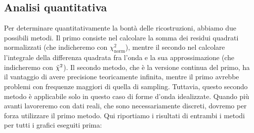 \documentclass{article}[a4paper, oneside,11pt]
\begin{document}
    \subsection{Analisi quantitativa}
    Per determinare quantitativamente la bontà delle ricostruzioni, abbiamo due possibili metodi. Il primo consiste nel calcolare la somma dei residui quadrati normalizzati (che indicheremo con $\chi^2_{\text{norm}}$), mentre il secondo nel calcolare l'integrale della differenza quadrata fra l'onda e la sua approssimazione (che indicheremo con $\Tilde{\chi}^2$). Il secondo metodo, che è la versione continua del primo, ha il vantaggio di avere precisione teoricamente infinita, mentre il primo avrebbe problemi con frequenze maggiori di quella di sampling. Tuttavia, questo secondo metodo è applicabile solo in questo caso di forme d'onda idealizzate. Quando più avanti lavoreremo con dati reali, che sono necessariamente discreti, dovremo per forza utilizzare il primo metodo. Qui riportiamo i risultati di entrambi i metodi per tutti i grafici eseguiti prima:
\end{document}
